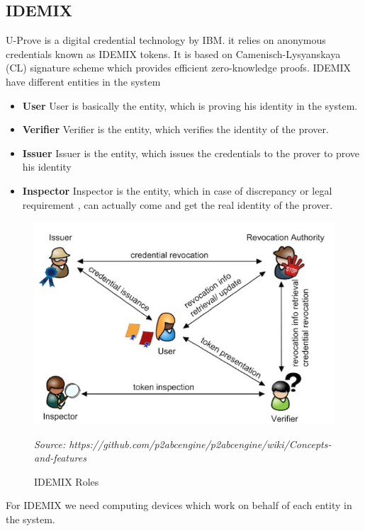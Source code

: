 \subsection{IDEMIX}
U-Prove is a digital credential technology by IBM. it relies on anonymous credentials known as IDEMIX tokens. It is based on Camenisch-Lysyanskaya (CL) signature scheme which provides efficient zero-knowledge proofs. IDEMIX  have different entities in the system
\begin{itemize}
	\item \textbf{User} User is basically the entity, which is proving his identity in the system.
	\item \textbf{Verifier} Verifier is the entity, which verifies the identity of the prover.
	\item \textbf{Issuer} Issuer is the entity, which issues the credentials to the prover to prove his identity
	\item \textbf{Inspector} Inspector is the entity, which in case of discrepancy or legal requirement , can actually come and get the real identity of the prover.
\end{itemize}
\begin{figure}[h]
	\centering
	\includegraphics[width=\textwidth]{figures/Roles}
	\begin{minipage}{\textwidth}
		\footnotesize
		\emph{Source: https://github.com/p2abcengine/p2abcengine/wiki/Concepts-and-features}
	\end{minipage}
	\caption{IDEMIX Roles}
	\label{fig:Roles}
\end{figure}

For IDEMIX we need computing devices which work on behalf of each entity in the system.
